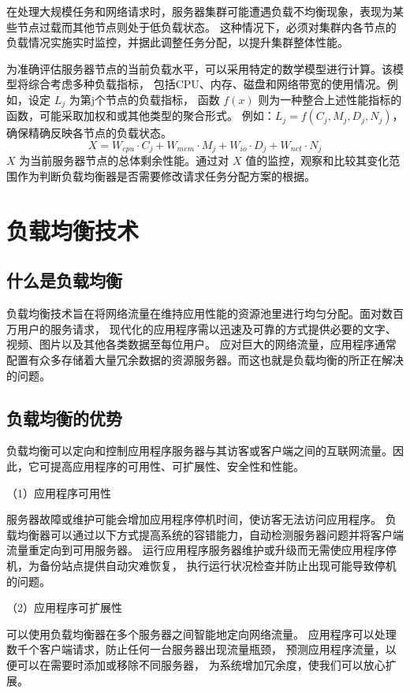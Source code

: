 在处理大规模任务和网络请求时，服务器集群可能遭遇负载不均衡现象，表现为某些节点过载而其他节点则处于低负载状态。
这种情况下，必须对集群内各节点的负载情况实施实时监控，并据此调整任务分配，以提升集群整体性能。

为准确评估服务器节点的当前负载水平，可以采用特定的数学模型进行计算。该模型将综合考虑多种负载指标，
包括CPU、内存、磁盘和网络带宽的使用情况。例如，设定 $L_{j}$ 为第j个节点的负载指标，
函数 $f(x)$ 则为一种整合上述性能指标的函数，可能采取加权和或其他类型的聚合形式。
例如：$L_{j} = f(C_{j}, M_{j}, D_{j}, N_{j})$，确保精确反映各节点的负载状态。
\[
	X = W_{cpu} \cdot C_j + W_{mem} \cdot M_j + W_{io} \cdot D_j + W_{net} \cdot N_j\tag{1.1}
\]
$X$ 为当前服务器节点的总体剩余性能。通过对 $X$ 值的监控，观察和比较其变化范围作为判断负载均衡器是否需要修改请求任务分配方案的根据。

\section{负载均衡技术}

\subsection{什么是负载均衡}

负载均衡技术旨在将网络流量在维持应用性能的资源池里进行均匀分配。面对数百万用户的服务请求，
现代化的应用程序需以迅速及可靠的方式提供必要的文字、视频、图片以及其他各类数据至每位用户。
应对巨大的网络流量，应用程序通常配置有众多存储着大量冗余数据的资源服务器。而这也就是负载均衡的所正在解决的问题。

\subsection{负载均衡的优势}

负载均衡可以定向和控制应用程序服务器与其访客或客户端之间的互联网流量。因此，它可提高应用程序的可用性、可扩展性、安全性和性能。

（1）应用程序可用性

服务器故障或维护可能会增加应用程序停机时间，使访客无法访问应用程序。
负载均衡器可以通过以下方式提高系统的容错能力，自动检测服务器问题并将客户端流量重定向到可用服务器。
运行应用程序服务器维护或升级而无需使应用程序停机，为备份站点提供自动灾难恢复，
执行运行状况检查并防止出现可能导致停机的问题。

（2）应用程序可扩展性

可以使用负载均衡器在多个服务器之间智能地定向网络流量。
应用程序可以处理数千个客户端请求，防止任何一台服务器出现流量瓶颈，
预测应用程序流量，以便可以在需要时添加或移除不同服务器，
为系统增加冗余度，使我们可以放心扩展。

